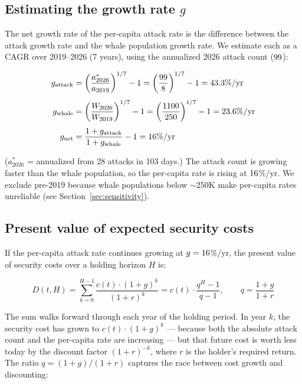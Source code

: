 \documentclass[a4paper,11pt]{article}
\def\aXXVIytd{28}     %
\def\daysXXVI{103}    %
\def\wXXVI{1100}
\edef\aXXVIann{\fpeval{\aXXVIytd * 365 / \daysXXVI}}
\edef\gAtk{\fpeval{exp(1/7 * ln(\aXXVIann/\aXIX)) - 1}}
\edef\gWhale{\fpeval{exp(1/7 * ln(\wXXVI/\wXIX)) - 1}}
\edef\gNet{\fpeval{(1 + \gAtk)/(1 + \gWhale) - 1}}
\begin{document}
\subsection{Estimating the growth rate $g$}

The net growth rate of the per-capita attack rate is the difference between the attack growth rate and the whale population growth rate. We estimate each as a CAGR over 2019--2026 (7 years), using the annualized 2026 attack count ($\fpeval{round(\aXXVIann, 0)}$):

\begin{align*}
  g_{\text{attack}} &= \left(\frac{a_{2026}^*}{a_{2019}}\right)^{1/7} - 1 = \left(\frac{\fpeval{round(\aXXVIann, 0)}}{\aXIX}\right)^{1/7} - 1 = \fpeval{round(\gAtk * 100, 1)}\%/\text{yr}\\[4pt]
  g_{\text{whale}} &= \left(\frac{W_{2026}}{W_{2019}}\right)^{1/7} - 1 = \left(\frac{\wXXVI}{\wXIX}\right)^{1/7} - 1 = \fpeval{round(\gWhale * 100, 1)}\%/\text{yr}\\[4pt]
  g_{\text{net}} &= \frac{1 + g_{\text{attack}}}{1 + g_{\text{whale}}} - 1 = \fpeval{round(\gNet * 100, 1)}\%/\text{yr}
\end{align*}

\noindent ($a_{2026}^*$ = annualized from \aXXVIytd{} attacks in \daysXXVI{} days.) The attack count is growing faster than the whale population, so the per-capita rate is rising at $\fpeval{round(\gNet * 100, 1)}$\%/yr. We exclude pre-2019 because whale populations below $\sim$250K make per-capita rates unreliable (see Section~\ref{sec:sensitivity}).

\subsection{Present value of expected security costs}

If the per-capita attack rate continues growing at $g = \fpeval{round(\gNet * 100, 1)}$\%/yr, the present value of security costs over a holding horizon $H$ is:

\begin{equation}
  D(t, H) = \sum_{k=0}^{H-1} \frac{c(t) \cdot (1 + g)^k}{(1 + r)^k} = c(t) \cdot \frac{q^H - 1}{q - 1}, \qquad q = \frac{1+g}{1+r}
  \label{eq:pv}
\end{equation}

\noindent The sum walks forward through each year of the holding period. In year $k$, the security cost has grown to $c(t) \cdot (1+g)^k$ --- because both the absolute attack count and the per-capita rate are increasing --- but that future cost is worth less today by the discount factor $(1+r)^{-k}$, where $r$ is the holder's required return. The ratio $q = (1+g)/(1+r)$ captures the race between cost growth and discounting:
\end{document}
